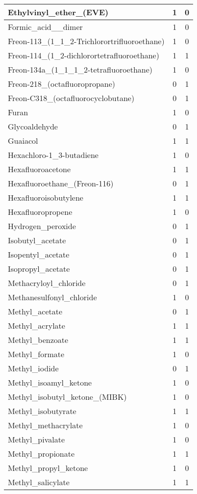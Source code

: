 \begin{longtable}{|l|c|c|}
Ethylvinyl\_ether\_(EVE) &1 &0\\ \hline
Formic\_acid\_\_dimer &1 &0\\ \hline
Freon-113\_(1\_1\_2-Trichlorortrifluoroethane) &1 &0\\ \hline
Freon-114\_(1\_2-dichlorortetrafluoroethane) &1 &1\\ \hline
Freon-134a\_(1\_1\_1\_2-tetrafluoroethane) &1 &0\\ \hline
Freon-218\_(octafluoropropane) &0 &1\\ \hline
Freon-C318\_(octafluorocyclobutane) &0 &1\\ \hline
Furan &1 &0\\ \hline
Glycoaldehyde &0 &1\\ \hline
Guaiacol &1 &1\\ \hline
Hexachloro-1\_3-butadiene &1 &0\\ \hline
Hexafluoroacetone &1 &1\\ \hline
Hexafluoroethane\_(Freon-116) &0 &1\\ \hline
Hexafluoroisobutylene &1 &1\\ \hline
Hexafluoropropene &1 &0\\ \hline
Hydrogen\_peroxide &0 &1\\ \hline
Isobutyl\_acetate &0 &1\\ \hline
Isopentyl\_acetate &0 &1\\ \hline
Isopropyl\_acetate &0 &1\\ \hline
Methacryloyl\_chloride &0 &1\\ \hline
Methanesulfonyl\_chloride &1 &0\\ \hline
Methyl\_acetate &0 &1\\ \hline
Methyl\_acrylate &1 &1\\ \hline
Methyl\_benzoate &1 &1\\ \hline
Methyl\_formate &1 &0\\ \hline
Methyl\_iodide &0 &1\\ \hline
Methyl\_isoamyl\_ketone &1 &0\\ \hline
Methyl\_isobutyl\_ketone\_(MIBK) &1 &0\\ \hline
Methyl\_isobutyrate &1 &1\\ \hline
Methyl\_methacrylate &1 &0\\ \hline
Methyl\_pivalate &1 &0\\ \hline
Methyl\_propionate &1 &1\\ \hline
Methyl\_propyl\_ketone &1 &0\\ \hline
Methyl\_salicylate &1 &1\\ \hline

\end{longtable}
